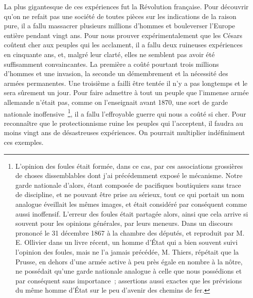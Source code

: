 \documentclass[french,twoside]{book} %
\begin{document}
La plus gigantesque de ces expériences fut la Révolution française. Pour décou­vrir qu’on ne refait pas une société de toutes pièces sur les indications de la raison pure, il a fallu massacrer plusieurs millions d’hommes et bouleverser l’Europe entière pendant vingt ans. Pour nous prouver expérimentalement que les Césars coûtent cher aux peuples qui les acclament, il a fallu deux ruineuses expériences en cinquante ans, et, malgré leur clarté, elles ne semblent pas avoir été suffisamment convaincantes. La première a coûté pourtant trois millions d’hommes et une invasion, la seconde un démembrement et la nécessité des armées permanentes. Une troisième a failli être tentée il n’y a pas longtemps et le sera sûrement un jour. Pour faire admettre à tout un peuple que l’immense armée allemande n’était pas, comme on l’enseignait avant 1870, une sort de garde nationale inoffensive \footnote{L’opinion des foules était formée, dans ce cas, par ces associations grossières de choses dissem­blables dont j’ai pré­cédemment exposé le mécanisme. Notre garde nationale d’alors, étant composée de pacifiques boutiquiers sans trace de discipline, et ne pouvant être prise au sérieux, tout ce qui portait un nom analogue éveillait les mêmes images, et était considéré par conséquent comme aussi inoffensif. L’erreur des foules était partagée alors, ainsi que cela arrive si sou­vent pour les opinions générales, par leurs meneurs. Dans un discours prononcé le 31 décembre 1867 à la chambre des députés, et reproduit par M. E. Ollivier dans un livre récent, un homme d’État qui a bien souvent suivi l’opinion des foules, mais ne l’a jamais précédée, M. Thiers, répétait que la Prusse, en dehors d’une armée active à peu près égale en nombre à la nôtre, ne possédait qu’une garde nationale ana­logue à celle que nous possédions et par conséquent sans importance ; asser­tions aussi exactes que les prévisions du même homme d’État sur le peu d’avenir des chemins de fer.}, il a fallu l’effroyable guerre qui nous a coûté si cher. Pour reconnaître que le protectionnisme ruine les peuples qui l’acceptent, il faudra au moins vingt ans de désastreuses expériences. On pourrait multiplier indéfi­niment ces exemples.
\end{document}
